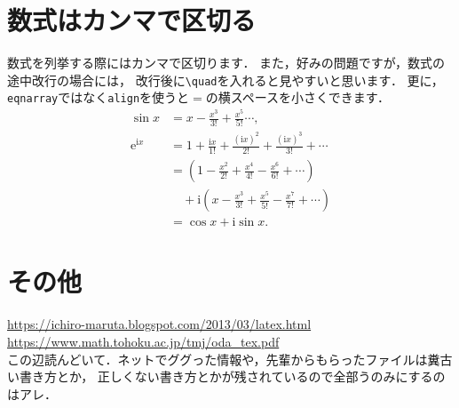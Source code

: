 \documentclass[a4j, dvipdfmx]{jsarticle}
\begin{document}
\section{数式はカンマで区切る}
  数式を列挙する際にはカンマで区切ります．
  また，好みの問題ですが，数式の途中改行の場合には，
  改行後に\verb|\quad|を入れると見やすいと思います．
  更に，\texttt{eqnarray}ではなく\texttt{align}を使うと$=$の横スペースを小さくできます．
    \begin{align}
      \sin x &= x - \frac{x^3}{3!} + \frac{x^5}{5!} \cdots , \\
      \mathrm{e}^{\mathrm{i} x} &= 1 + \frac{\mathrm{i}x}{1!} + \frac{(\mathrm{i}x)^2}{2!} + \frac{(\mathrm{i}x)^3}{3!} + \cdots  \\
      &= \left(1 - \frac{x^2}{2!} + \frac{x^4}{4!} - \frac{x^6}{6!} + \cdots \right) \nonumber\\
      &\quad + \mathrm{i}\left(x - \frac{x^3}{3!} + \frac{x^5}{5!} - \frac{x^7}{7!} + \cdots \right) \\
      &= \cos x + \mathrm{i}\sin x .
    \end{align}

\section{その他}
  \url{https://ichiro-maruta.blogspot.com/2013/03/latex.html} \\
  \url{https://www.math.tohoku.ac.jp/tmj/oda_tex.pdf}\\
  この辺読んどいて．ネットでググった情報や，先輩からもらったファイルは糞古い書き方とか，
  正しくない書き方とかが残されているので全部うのみにするのはアレ．
\end{document}
